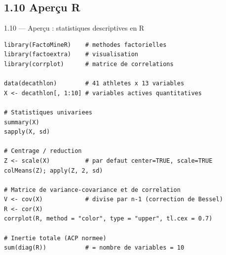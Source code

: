 \subsection{1.10 Aperçu R}
\begin{frame}[fragile]{1.10 — Aperçu : statistiques descriptives en R}
\begin{lstlisting}
library(FactoMineR)    # methodes factorielles
library(factoextra)    # visualisation
library(corrplot)      # matrice de correlations

data(decathlon)        # 41 athletes x 13 variables
X <- decathlon[, 1:10] # variables actives quantitatives

# Statistiques univariees
summary(X)
sapply(X, sd)

# Centrage / reduction
Z <- scale(X)          # par defaut center=TRUE, scale=TRUE
colMeans(Z); apply(Z, 2, sd)

# Matrice de variance-covariance et de correlation
V <- cov(X)            # divise par n-1 (correction de Bessel)
R <- cor(X)
corrplot(R, method = "color", type = "upper", tl.cex = 0.7)

# Inertie totale (ACP normee)
sum(diag(R))           # = nombre de variables = 10
\end{lstlisting}
\end{frame}

